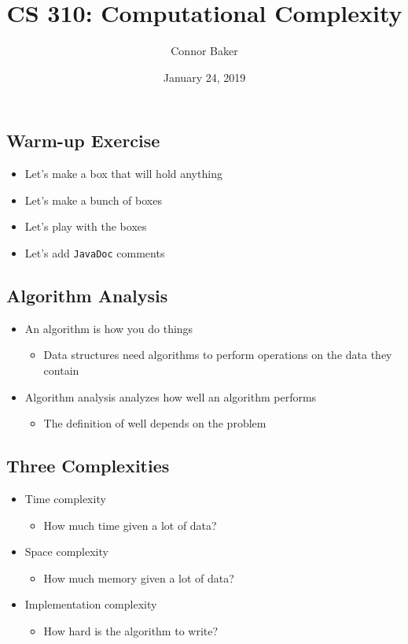 \documentclass[10pt]{article}
\title{CS 310: Computational Complexity}
\author{Connor Baker}
\date{January 24, 2019}
\begin{document}
\maketitle

\subsection*{Warm-up Exercise}
\begin{itemize}
\item Let's make a box that will hold anything
\item Let's make a bunch of boxes
\item Let's play with the boxes
\item Let's add \texttt{JavaDoc} comments
\end{itemize}

\subsection*{Algorithm Analysis}
\begin{itemize}
\item An algorithm is how you do things
\begin{itemize}
\item Data structures need algorithms to perform operations on the data they contain
\end{itemize}
\item Algorithm analysis analyzes how well an algorithm performs
\begin{itemize}
\item The definition of well depends on the problem
\end{itemize}
\end{itemize}

\subsection*{Three Complexities}
\begin{itemize}
\item Time complexity
\begin{itemize}
\item How much time given a lot of data?
\end{itemize}
\item Space complexity
\begin{itemize}
\item How much memory given a lot of data?
\end{itemize}
\item Implementation complexity
\begin{itemize}
\item How hard is the algorithm to write?
\end{itemize}
\end{itemize}
\end{document}
